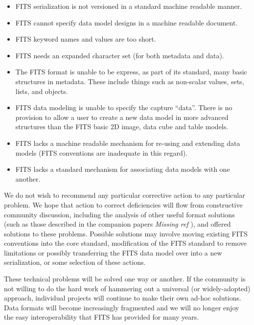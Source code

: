 \documentclass[final,authoryear,5p,times,twocolumn]{elsarticle}
\begin{document}
{{\begin{itemize}

\item FITS serialization is not versioned in a standard machine readable manner. 

\item FITS cannot specify data model designs in a machine readable document.

\item FITS keyword names and values are too short.

\item FITS needs an expanded character set (for both metadata and data).

\item The FITS format is unable to be express, as part of its standard,
many basic structures in metadata. These include things such as non-scalar
values, sets, lists, and objects.

\item FITS data modeling is unable to specify the capture ``data''.
There is no provision to allow a user to create a new data model in more 
advanced structures than the FITS basic 2D image, data cube and table models.

\item FITS lacks a machine readable mechanism for re-using and extending data models 
(FITS conventions are inadequate in this regard). 

\item FITS lacks a standard mechanism for associating data models with one another.

\end{itemize}
 

We do not wish to recommend any particular corrective action to any particular 
problem. We hope that action to correct deficiencies will flow from 
constructive community discussion, including the analysis of
other useful format solutions (such as those described in the
companion papers {\color{red} \textit{Missing ref} }\citep{2014arXiv1403.2801K,2014Jenness}), and offered solutions to these problems.
Possible solutions may involve moving existing FITS conventions into the core
standard, modification of the FITS standard to remove limitations or
possibly transferring the FITS data model over into a new
serialization, or some selection of these actions.


These technical problems will be solved one way or another. If the
community is not willing to do the hard work of hammering out a
universal (or widely-adopted) approach, individual projects will
continue to make their own ad-hoc solutions. Data formats will become
increasingly fragmented and we will no longer enjoy the easy
interoperability that FITS has provided for many years.



}}
\end{document}
